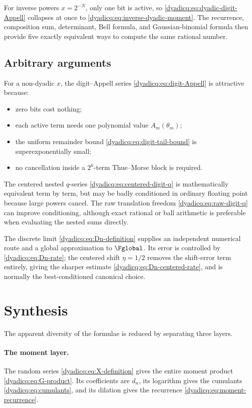 \documentclass[11pt,oneside]{article}
\theoremstyle{definition}
\theoremstyle{remark}
\begin{document}
For inverse powers $x=2^{-N}$, only one bit is active, so
\eqref{dyadicq:eq:dyadic-digit-Appell} collapses at once to
\eqref{dyadicq:eq:inverse-dyadic-moment}.  The recurrence, composition sum,
determinant, Bell formula, and Gaussian-binomial formula then provide five
exactly equivalent ways to compute the same rational number.

\subsection{Arbitrary arguments}

For a non-dyadic $x$, the digit--Appell series
\eqref{dyadicq:eq:digit-Appell} is attractive because:
\begin{itemize}
\item zero bits cost nothing;
\item each active term needs one polynomial value $A_m(\theta_m)$;
\item the uniform remainder bound \eqref{dyadicq:eq:digit-tail-bound} is
  superexponentially small;
\item no cancellation inside a $2^k$-term Thue--Morse block is required.
\end{itemize}

The centered nested $q$-series \eqref{dyadicq:eq:centered-digit-q} is mathematically
equivalent term by term, but may be badly conditioned in ordinary floating
point because large powers cancel.  The raw translation freedom
\eqref{dyadicq:eq:raw-digit-q} can improve conditioning, although exact rational or
ball arithmetic is preferable when evaluating the nested sums directly.

The discrete limit \eqref{dyadicq:eq:Dn-definition} supplies an independent numerical
route and a global approximation to $\Fglobal$.  Its error is controlled by
\eqref{dyadicq:eq:Dn-rate}; the centered shift $\eta=1/2$ removes the shift-error term
entirely, giving the sharper estimate \eqref{dyadicq:eq:Dn-centered-rate}, and is
normally the best-conditioned canonical choice.

\section{Synthesis}

The apparent diversity of the formulae is reduced by separating three layers.

\paragraph{The moment layer.}
The random series \eqref{dyadicq:eq:X-definition} gives the entire moment product
\eqref{dyadicq:eq:G-product}.  Its coefficients are $d_n$, its logarithm gives the
cumulants \eqref{dyadicq:eq:cumulants}, and its dilation gives the recurrence
\eqref{dyadicq:eq:moment-recurrence}.
\end{document}
